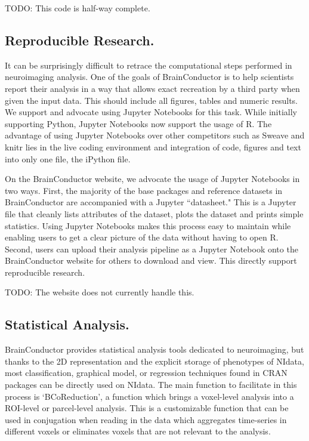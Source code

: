 \documentclass{nature}
\begin{document}
{\color{red}TODO: This code is half-way complete.}

\subsection{Reproducible Research.}

It can be surprisingly difficult to retrace the computational steps performed
in neuroimaging analysis. One of the goals of BrainConductor is to help
scientists report their analysis in a way that allows exact recreation by
a third party when given the input data. This should include all figures,
tables and numeric results. We support and advocate using Jupyter Notebooks for
this task. While initially supporting Python, Jupyter Notebooks now support
the usage of R. The advantage of using Jupyter Notebooks over other competitors
such as Sweave and knitr lies in the live coding environment and
integration of code, figures and text into only one file, the iPython file.

On the BrainConductor website, we advocate the usage of Jupyter Notebooks
in two ways. First, the majority of the base packages and reference datasets
in BrainConductor are accompanied with a Jupyter ``datasheet." This is a
Jupyter file that cleanly lists attributes of the dataset, plots the dataset
and prints simple statistics. Using Jupyter Notebooks makes this process easy
to maintain while enabling users to get a clear picture of the data without
having to open R. Second, users can upload their analysis pipeline as a Jupyter
Notebook onto the BrainConductor website for others to download and view. This
directly support reproducible research.

{\color{red}TODO: The website does not currently handle this.}

\subsection{Statistical Analysis.}

BrainConductor provides statistical analysis tools dedicated to neuroimaging,
but thanks to the 2D representation and the explicit storage of
phenotypes of NIdata, most classification, graphical model, or regression
techniques
found in CRAN packages can be directly used on NIdata. The main function to
facilitate in this process is `BCoReduction', a function which brings a
voxel-level
analysis into a ROI-level or parcel-level analysis. This is a customizable
function
that can be used in conjugation when reading in the data which aggregates
time-series
in different voxels or eliminates voxels that are not relevant to the analysis.
\end{document}
